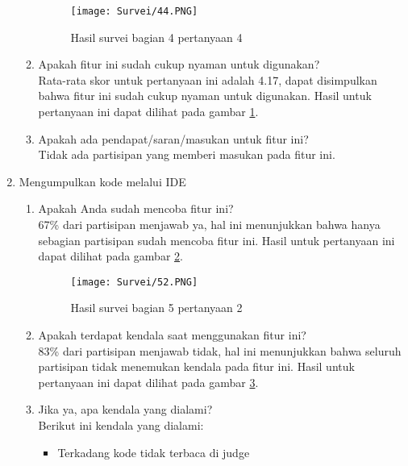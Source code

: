 \begin{enumerate}
\begin{enumerate}
\begin{figure}[H]
        	\centering  
        	\texttt{[image: Survei/44.PNG]}  
        	\caption{Hasil survei bagian 4 pertanyaan 4}
        	\label{fig:5:survei44} 
        \end{figure}
        \item Apakah fitur ini sudah cukup nyaman untuk digunakan? \\ Rata-rata skor untuk pertanyaan ini adalah 4.17, dapat disimpulkan bahwa fitur ini sudah cukup nyaman untuk digunakan. Hasil untuk pertanyaan ini dapat dilihat pada gambar \ref{fig:5:survei44}.
        \item Apakah ada pendapat/saran/masukan untuk fitur ini? \\ Tidak ada partisipan yang memberi masukan pada fitur ini.
    \end{enumerate}
    \item Mengumpulkan kode melalui IDE
        \begin{enumerate}
        \begin{figure}[H]
        	\centering  
        	\texttt{[image: Survei/51.PNG]}  
        	\caption{Hasil survei bagian 5 pertanyaan 1}
        	\label{fig:5:survei51} 
        \end{figure}
        \item Apakah Anda sudah mencoba fitur ini? \\ 67\% dari partisipan menjawab ya, hal ini menunjukkan bahwa hanya sebagian partisipan sudah mencoba fitur ini. Hasil untuk pertanyaan ini dapat dilihat pada gambar \ref{fig:5:survei51}.
        \begin{figure}[H]
        	\centering  
        	\texttt{[image: Survei/52.PNG]}  
        	\caption{Hasil survei bagian 5 pertanyaan 2}
        	\label{fig:5:survei52} 
        \end{figure}
        \item Apakah terdapat kendala saat menggunakan fitur ini? \\ 83\% dari partisipan menjawab tidak, hal ini menunjukkan bahwa seluruh partisipan tidak menemukan kendala pada fitur ini. Hasil untuk pertanyaan ini dapat dilihat pada gambar \ref{fig:5:survei52}.
        \item Jika ya, apa kendala yang dialami? \\ Berikut ini kendala yang dialami:
        \begin{itemize}
            \item Terkadang kode tidak terbaca di judge
        \end{itemize}

\end{enumerate}
\end{enumerate}
